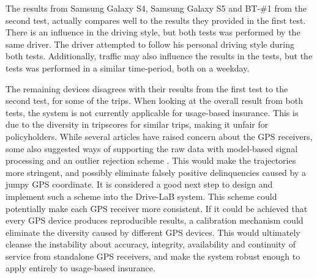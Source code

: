 The results from Samsung Galaxy S4, Samsung Galaxy S5 and BT-\#1 from the second test, actually compares well to the results they provided in the first test. There is an influence in the driving style, but both tests was performed by the same driver. The driver attempted to follow his personal driving style during both tests. Additionally, traffic may also influence the results in the tests, but the tests was performed in a similar time-period, both on a weekday. 

The remaining devices disagrees with their results from the first test to the second test, for some of the trips. When looking at the overall result from both tests, the system is not currently applicable for usage-based insurance. This is due to the diversity in tripscores for similar trips, making it unfair for policyholders. While several articles have raised concern about the GPS receivers, some also suggested ways of supporting the raw data with model-based signal processing and an outlier rejection scheme \citep{art:challenges_smartphone_ubi} \citep{art:smartphones_for_monitoring_and_ubi} \citep{art:insurtelematics}. This would make the trajectories more stringent, and possibly eliminate falsely positive delinquencies caused by a jumpy GPS coordinate. It is considered a good next step to design and implement such a scheme into the Drive-LaB system. This scheme could potentially make each GPS receiver more consistent. If it could be achieved that every GPS device produces reproducible results, a calibration mechanism could eliminate the diversity caused by different GPS devices. This would ultimately cleanse the instability about accuracy, integrity, availability and continuity of service from standalone GPS receivers, and make the system robust enough to apply entirely to usage-based insurance.


